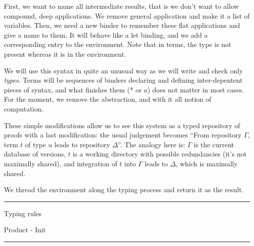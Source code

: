 \documentclass[12pt]{article} \usepackage{beamerarticle} \usepackage{fullpage}
\begin{document}
First, we want to name all intermediate results, that is we don't want
to allow compound, deep applications. We remove general application
and make it a list of variables. Then, we need a new binder to
remember these flat applications and give a name to them. It will
behave like a \textsf{let} binding, and we add a corresponding entry
to the environment. Note that in terms, the type is not present
whereas it is in the environment.

We will use this syntax in quite an unusual way as we will write and
check only \emph{types}. Terms will be sequences of binders declaring
and defining inter-depentent pieces of syntax, and what finishes them
(* or $a$) does not matter in most cases. For the moment, we remove
the abstraction, and with it all notion of computation.

These simple modifications allow us to see this system as a typed
repository of proofs with a last modification: the usual judgement
becomes ``From repository $\Gamma$, term $t$ of type $u$ leads to
repository $\Delta$''. The analogy here is: $\Gamma$ is the current
database of versions, $t$ is a working directory with possible
redundancies (it's not maximally shared), and integration of $t$ into
$\Gamma$ leads to $\Delta$, which is maximally shared.

We thread the environment along the typing process and return it as
the result.

\hrule
\begin{frame}{Typing rules}
  \begin{block}{Product - Init}
  \end{block}
\end{frame}
\hrule
\end{document}
